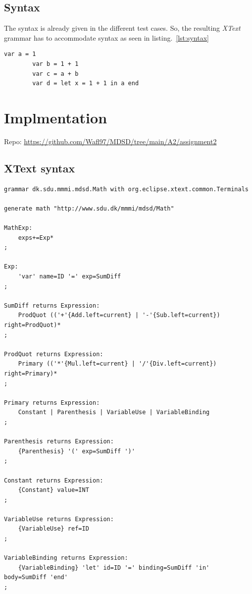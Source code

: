 \documentclass{article}
\begin{document}
\subsection{Syntax}

The syntax is already given in the different test cases. So, the resulting \textit{XText} grammar has to accommodate syntax as seen in listing.~\ref{lst:syntax}

\begin{center}
    \begin{lstlisting}[language={math}, captionpos={b}, caption={Examples of *.math syntax}, label={lst:syntax}]
        var a = 1
        var b = 1 + 1
        var c = a + b
        var d = let x = 1 + 1 in a end
    \end{lstlisting}
\end{center}

\section{Implmentation}

Repo: \url{https://github.com/Wafl97/MDSD/tree/main/A2/assignment2}

\subsection{XText syntax}
\begin{lstlisting}[caption={XText syntax}, captionpos={b}]
grammar dk.sdu.mmmi.mdsd.Math with org.eclipse.xtext.common.Terminals

generate math "http://www.sdu.dk/mmmi/mdsd/Math"

MathExp:
    exps+=Exp*
;

Exp:
    'var' name=ID '=' exp=SumDiff
;

SumDiff returns Expression:
    ProdQuot (('+'{Add.left=current} | '-'{Sub.left=current}) right=ProdQuot)*
;

ProdQuot returns Expression:
    Primary (('*'{Mul.left=current} | '/'{Div.left=current}) right=Primary)*
;

Primary returns Expression:
    Constant | Parenthesis | VariableUse | VariableBinding
;

Parenthesis returns Expression:
    {Parenthesis} '(' exp=SumDiff ')'
;

Constant returns Expression:
    {Constant} value=INT
;

VariableUse returns Expression:
    {VariableUse} ref=ID
;

VariableBinding returns Expression:
    {VariableBinding} 'let' id=ID '=' binding=SumDiff 'in' body=SumDiff 'end'
;
\end{lstlisting}
\end{document}
